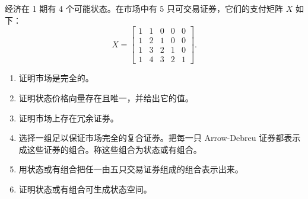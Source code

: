 \begin{problem}
 经济在 1 期有 4 个可能状态。在市场中有 5 只可交易证券，它们的支付矩阵 $X$ 如下：
\[
    X=\begin{bmatrix}
        1 & 1 & 0 & 0 & 0 \\
        1 & 2 & 1 & 0 & 0 \\
        1 & 3 & 2 & 1 & 0 \\
        1 & 4 & 3 & 2 & 1
    \end{bmatrix}.
\]
\begin{enumerate}[label=(\alph*)]
    \item 证明市场是完全的。
    \item 证明状态价格向量存在且唯一，并给出它的值。
    \item 证明市场上存在冗余证券。
    \item 选择一组足以保证市场完全的复合证券。把每一只 Arrow-Debreu 证券都表示成这些证券的组合。称这些组合为状态或有组合。
    \item 用状态或有组合把任一由五只交易证券组成的组合表示出来。
    \item 证明状态或有组合可生成状态空间。
\end{enumerate}
\end{problem}
